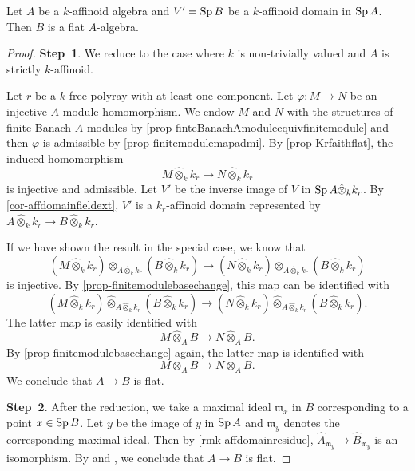 \begin{thm}\label{thm-affdomainflat}
    Let $A$ be a $k$-affinoid algebra and $V'=\operatorname{Sp} B$ be a $k$-affinoid domain in $\operatorname{Sp} A$. Then $B$ is a flat $A$-algebra.
\end{thm}
\begin{proof}
    

    \textbf{Step~1}. We reduce to the case where $k$ is non-trivially valued and $A$ is strictly $k$-affinoid.

    Let $r$ be a $k$-free polyray with at least one component. Let $\varphi:M\rightarrow N$ be an injective $A$-module homomorphism.  We endow $M$ and $N$ with the structures of finite Banach $A$-modules by \cref{prop-finteBanachAmoduleequivfinitemodule} and then $\varphi$ is admissible by \cref{prop-finitemodulemapadmi}. By \cref{prop-Krfaithflat}, the induced homomorphism
    \[
        M\hat{\otimes}_k k_r\rightarrow  N\hat{\otimes}_k k_r 
    \]
    is injective and admissible. Let $V'$ be the inverse image of $V$ in $\operatorname{Sp} A\hat{\otimes}_k k_r$. By \cref{cor-affdomainfieldext}, $V'$ is a $k_r$-affinoid domain represented by $A\hat{\otimes}_k k_r\rightarrow B\hat{\otimes}_k k_r$.

    If we have shown the result in the special case, we know that 
    \[
        (M\hat{\otimes}_k k_r)\otimes_{A\hat{\otimes}_k k_r}(B\hat{\otimes}_k k_r)\rightarrow  (N\hat{\otimes}_k k_r) \otimes_{A\hat{\otimes}_k k_r}(B\hat{\otimes}_k k_r)
    \]
    is injective. By \cref{prop-finitemodulebasechange}, this map can be identified with 
    \[
        (M\hat{\otimes}_k k_r)\hat{\otimes}_{A\hat{\otimes}_k k_r}(B\hat{\otimes}_k k_r)\rightarrow  (N\hat{\otimes}_k k_r) \hat{\otimes}_{A\hat{\otimes}_k k_r}(B\hat{\otimes}_k k_r).
    \]
    The latter map is easily identified with
    \[
        M\hat{\otimes}_A B\rightarrow    N\hat{\otimes}_A B.
    \]
    By \cref{prop-finitemodulebasechange} again, the latter map is identified with 
    \[
        M\otimes_A B\rightarrow    N\otimes_A B.
    \]  
    We conclude that $A\rightarrow B$ is flat.

    \textbf{Step~2}. After the reduction, we take a maximal ideal $\mathfrak{m}_x$ in $B$ corresponding to a point $x\in \operatorname{Sp} B$. Let $y$ be the image of $y$ in $\operatorname{Sp} A$ and $\mathfrak{m}_y$ denotes the corresponding maximal ideal. Then by \cref{rmk-affdomainresidue}, $\hat{A}_{\mathfrak{m}_y}\rightarrow \hat{B}_{\mathfrak{m}_y}$ is an isomorphism. By  \cite[\href{https://stacks.math.columbia.edu/tag/0C4G}{Tag 0C4G}]{stacks-project} and \cite[\href{https://stacks.math.columbia.edu/tag/0399}{Tag 0399}]{stacks-project}, we conclude that $A\rightarrow B$ is flat.
\end{proof}

